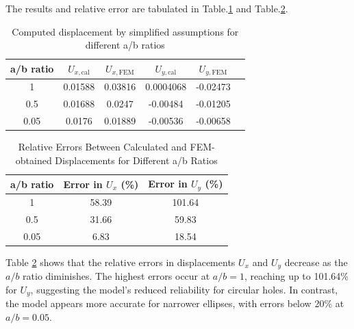 \documentclass[twoside,twocolumn,10pt]{article}
\begin{document}
The results and relative error are tabulated in Table.\ref{tab:U_eaxvsfem} and Table.\ref{tab:U_relative_error}.

\begin{table}[h]
\centering
\begin{tabular}{cccccc}
\toprule
a/b ratio & \(U_{x,\text{cal}}\) & \(U_{x,\text{FEM}}\) & \(U_{y,\text{cal}}\) & \(U_{y,\text{FEM}}\) \\
\midrule
1 & 0.01588 & 0.03816 & 0.0004068 & -0.02473  \\
0.5 & 0.01688 & 0.0247 & -0.00484 & -0.01205 \\
0.05 & 0.0176 & 0.01889 & -0.00536 & -0.00658\\
\bottomrule
\end{tabular}
\caption{Computed displacement by simplified assumptions for different a/b ratios }
\label{tab:U_eaxvsfem}
\end{table}

\begin{table}[!ht]
\centering

\begin{tabular}{ccc}
\toprule
a/b ratio & Error in \( U_{x} \) (\%) & Error in \( U_{y} \) (\%) \\
\midrule
1 & 58.39 & 101.64 \\
0.5 & 31.66 & 59.83 \\
0.05 & 6.83 & 18.54 \\
\bottomrule
\end{tabular}
\caption{Relative Errors Between Calculated and FEM-obtained Displacements for Different a/b Ratios}
\label{tab:U_relative_error}
\end{table}

Table \ref{tab:U_relative_error} shows that the relative errors in displacements \( U_{x} \) and \( U_{y} \) decrease as the \( a/b \) ratio diminishes. The highest errors occur at \( a/b = 1 \), reaching up to 101.64\% for \( U_{y} \), suggesting the model's reduced reliability for circular holes. In contrast, the model appears more accurate for narrower ellipses, with errors below 20\% at \( a/b = 0.05 \).


\end{document}
